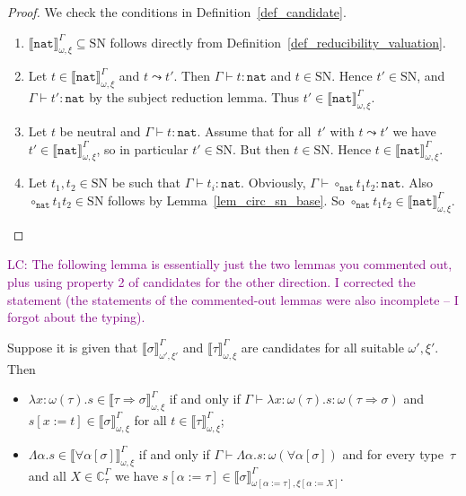 \documentclass[runningheads,a4paper]{llncs}
\newcommand{\quant}[2]{\forall #1[#2]}
\newcommand{\arrtype}{\Rightarrow}
\newcommand{\abs}[2]{\lambda #1.#2}
\newcommand{\tabs}[2]{\Lambda #1.#2}
\newcommand{\subst}[2]{#1:=#2}
\newcommand{\nat}{\mathtt{nat}}
\newcommand{\SN}{\mathrm{SN}}
\newcommand{\Cb}{\mathbb{C}}
\newcommand{\val}[3]{\ensuremath{\llbracket#1\rrbracket_{#2}^{#3}}}
\newcommand{\proves}{\vdash}
\newcommand{\LC}[1]{\textcolor{purple}{LC: #1}}
\begin{document}
\begin{proof}
  We check the conditions in Definition~\ref{def_candidate}.
  \begin{enumerate}
  \item $\val{\nat}{\omega,\xi}{\Gamma} \subseteq \SN$ follows
    directly from Definition~\ref{def_reducibility_valuation}.
  \item Let $t \in \val{\nat}{\omega,\xi}{\Gamma}$ and
    $t \leadsto t'$. Then $\Gamma \proves t : \nat$ and $t \in
    \SN$. Hence $t' \in \SN$, and $\Gamma \proves t' : \nat$ by the
    subject reduction lemma. Thus
    $t' \in \val{\nat}{\omega,\xi}{\Gamma}$.
  \item Let $t$ be neutral and $\Gamma \proves t : \nat$. Assume that
    for all~$t'$ with $t \leadsto t'$ we have
    $t' \in \val{\nat}{\omega,\xi}{\Gamma}$, so in particular
    $t' \in \SN$. But then $t \in \SN$. Hence
    $t \in \val{\nat}{\omega,\xi}{\Gamma}$.
  \item Let $t_1,t_2 \in \SN$ be such that
    $\Gamma \proves t_i : \nat$. Obviously,
    $\Gamma \proves \circ_\nat t_1 t_2 : \nat$. Also
    $\circ_\nat t_1 t_2 \in \SN$ follows by Lemma~\ref{lem_circ_sn_base}.
    So $\circ_\nat t_1 t_2 \in \val{\nat}{\omega,\xi}{\Gamma}$.
  \end{enumerate}
\end{proof}

\LC{The following lemma is essentially just the two lemmas you
  commented out, plus using property 2 of candidates for the other
  direction. I corrected the statement (the statements of the
  commented-out lemmas were also incomplete -- I forgot about the
  typing).}
\begin{lemma}\label{lem_abstraction_computable}
  Suppose it is given that $\val{\sigma}{\omega',\xi'}{\Gamma}$ and
  $\val{\tau}{\omega,\xi}{\Gamma}$ are candidates for all suitable
  $\omega',\xi'$.  Then
  \begin{itemize}
  \item
    $\abs{x:\omega(\tau)}{s} \in \val{\tau \arrtype
      \sigma}{\omega,\xi}{ \Gamma}$ if and only if
    $\Gamma \proves \abs{x:\omega(\tau)}{s} : \omega(\tau \arrtype
    \sigma)$ and $s[x:=t] \in \val{\sigma}{\omega,\xi}{\Gamma}$ for
    all $t \in \val{ \tau}{\omega,\xi}{\Gamma}$;
  \item
    $\tabs{\alpha}{s} \in \val{\quant{\alpha}{\sigma}}{\omega,\xi}{
      \Gamma}$ if and only if
    $\Gamma \proves \tabs{\alpha}{s} : \omega(\quant{\alpha}{\sigma})$
    and for every type~$\tau$ and all $X \in \Cb_\tau^\Gamma$ we have
    $s[\alpha:=\tau] \in
    \val{\sigma}{\omega[\subst{\alpha}{\tau}],\xi[\subst{\alpha}{X}]}{\Gamma}$.
  \end{itemize}
\end{lemma}
\end{document}
